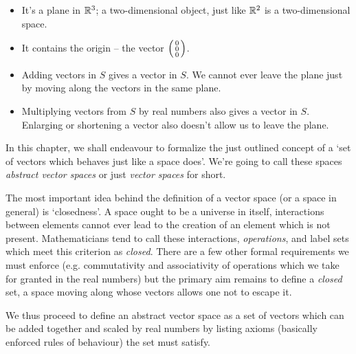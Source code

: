 \begin{itemize}
 \item It's a plane in $\mathbb{R}^3$; a two-dimensional object, just like $\mathbb{R}^2$ is a
  two-dimensional space.
 \item It contains the origin -- the vector $\begin{psmallmatrix} 0\\0\\0
  \end{psmallmatrix}$.
 \item Adding vectors in $S$ gives a vector in $S$. We cannot ever leave the
  plane just by moving along the vectors in the same plane.
 \item Multiplying vectors from $S$ by real numbers also gives a vector in $S$.
  Enlarging or shortening a vector also doesn't allow us to leave the plane.
\end{itemize}
In this chapter, we shall endeavour to formalize the just outlined concept of a
`set of vectors which behaves just like a space does'. We're going to call these
spaces \emph{abstract vector spaces} or just \emph{vector spaces} for short.

The most important idea behind the definition of a vector space (or a space in
general) is `closedness'. A space ought to be a universe in itself, interactions
between elements cannot ever lead to the creation of an element which is not
present. Mathematicians tend to call these interactions, \emph{operations}, and
label sets which meet this criterion as \emph{closed}. There are a few other
formal requirements we must enforce (e.g. commutativity and associativity of
operations which we take for granted in the real numbers) but the primary aim
remains to define a \emph{closed} set, a space moving along whose vectors allows
one not to escape it.

We thus proceed to define an abstract vector space as a set of vectors which can
be added together and scaled by real numbers by listing axioms (basically
enforced rules of behaviour) the set must satisfy.

